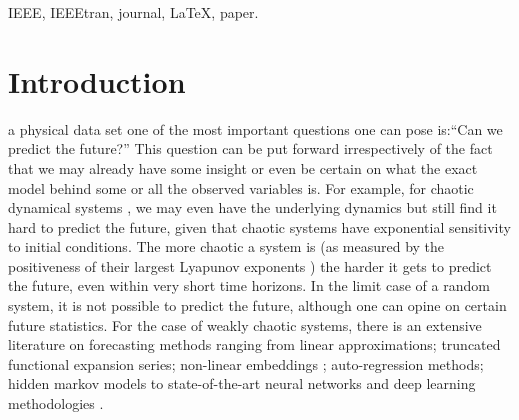 \documentclass[journal]{IEEEtran}
\begin{document}
\begin{IEEEkeywords}
IEEE, IEEEtran, journal, \LaTeX, paper.
\end{IEEEkeywords}






%
\IEEEpeerreviewmaketitle



\section{Introduction}
%
%
%
%
 a physical data set one of the most important questions one can pose is:``Can we predict the future?''
This question can be put forward irrespectively of the fact that we may already have some insight or even be
certain on what the exact model behind some or all the observed variables is. For example, for chaotic dynamical systems
\cite{0813340853,2004icti.book.....M}, we may even have the
underlying dynamics but still find it hard to predict the future, given that chaotic systems have exponential sensitivity to initial
conditions. The more chaotic a system is (as measured by the positiveness of their largest Lyapunov exponents
\cite{1985PhyD...16..285W,1994PhLA..185...77K}) the harder it gets to
predict the future, even within very short time horizons. In the limit case of a random system, it is not possible to predict the
future, although one can opine on certain future statistics\cite{9780486693873}.
For the case of weakly chaotic systems, there is an extensive literature on
forecasting methods ranging from linear approximations\cite{1451722};
truncated functional expansion series\cite{Powell:1987:RBF:48424.48433,Broomhead1988MultivariableFI}; non-linear embeddings
\cite{PhysRevLett.59.845};
auto-regression methods\cite{0130607746}; hidden markov models \cite{1165342}
to state-of-the-art neural networks and deep learning methodologies \cite{LANGKVIST201411}.
\end{document}
